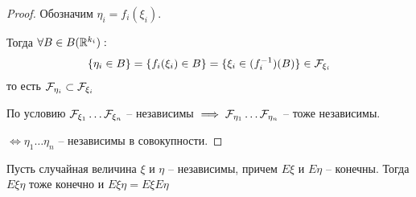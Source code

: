 \begin{proof}
  Обозначим $\eta_i = f_i (\xi_i)$. 

  Тогда $\forall B \in B(\mathbb{R}^{k_i}):$
  \begin{align*}
    \{ \eta_i \in B \} = \{ f_i (\xi_i) \in B \} = \{ \xi_i \in (f_i^{-1}) (B) \} \in \mathcal{F}_{\xi_i}
  \end{align*}
  то есть $\mathcal{F}_{\eta_i} \subset \mathcal{F}_{\xi_i}$

  По условию $\mathcal{F}_{\xi_1} \ldots \mathcal{F}_{\xi_n}$ -- независимы
  $\implies \mathcal{F}_{\eta_1} \ldots \mathcal{F}_{\eta_n}$ -- тоже независимы.

  $\iff \eta_1 \ldots \eta_n$ -- независимы в совокупности.
\end{proof}

\begin{theorem}
  Пусть случайная величина $\xi$ и $\eta$ -- независимы, причем $E \xi$ и $E \eta$ -- конечны. 
  Тогда $E \xi \eta$ тоже конечно и $E \xi \eta = E \xi E \eta$
\end{theorem}

